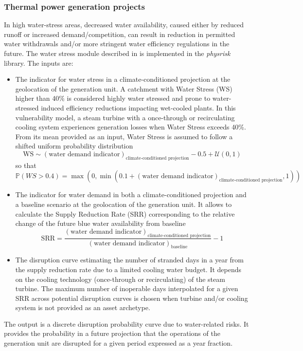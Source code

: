 \documentclass[a4paper,11pt]{extarticle} %
\theoremstyle{definition}
\begin{document}
\subsubsection{Thermal power generation projects}
In high water-stress areas, decreased water availability, caused either by reduced runoff or increased demand/competition, can result in reduction in permitted water withdrawals and/or more stringent water efficiency regulations in the future. The water stress module described in \cite{LuoEtAl:2021,LuoEtAl:2023} is implemented in the \emph{physrisk} library. The inputs are:
\begin{itemize}
\item The indicator for water stress in a climate-conditioned projection at the geolocation of the generation unit. A catchment with Water Stress (WS) higher than 40\% is considered highly water stressed and prone to water-stressed induced efficiency reductions impacting wet-cooled plants. In this vulnerability model, a steam turbine with a once-through or recirculating cooling system experiences generation losses when Water Stress exceeds 40\%. From its mean provided as an input, Water Stress is assumed to follow a shifted uniform probability distribution
$$
\text{WS}\sim\left(\text{water demand indicator}\right)_{\text{climate-conditioned projection}}-0.5+\mathcal{U}\left(0,1\right)
$$
so that
$$
\mathbb{P}\left(WS>0.4\right)=\max\left(0,\min\left(0.1+\left(\text{water demand indicator}\right)_{\text{climate-conditioned projection}},1\right)\right)
$$
\item The indicator for water demand in both a climate-conditioned projection and a baseline scenario at the geolocation of the generation unit. It allows to calculate the Supply Reduction Rate (SRR) corresponding to the relative change of the future blue water availability from baseline
$$
\text{SRR}=\displaystyle\frac{\left(\text{water demand indicator}\right)_{\text{climate-conditioned projection}}}{\left(\text{water demand indicator}\right)_{\text{baseline}}}-1
$$
\item The disruption curve estimating the number of stranded days in a year from the supply reduction rate due to a limited cooling water budget. It depends on the cooling technology (once-through or recirculating) of the steam turbine. The maximum number of inoperable days interpolated for a given SRR across potential disruption curves is chosen when turbine and/or cooling system is not provided as an asset archetype.
\end{itemize}
The output is a discrete disruption probability curve due to water-related risks. It provides the probability in a future projection that the operations of the generation unit are disrupted for a given period expressed as a year fraction.
\end{document}
